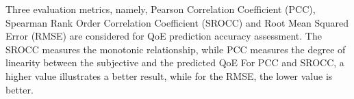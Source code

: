 Three evaluation metrics, namely, Pearson Correlation Coefficient (PCC), Spearman Rank Order Correlation Coefficient (SROCC) and Root Mean Squared Error (RMSE) are considered for QoE prediction accuracy assessment.
The SROCC measures the monotonic relationship, while PCC measures the degree of linearity
between the subjective and the predicted QoE
For PCC and SROCC, a higher value illustrates a better result, while for the RMSE, the lower value is better.

